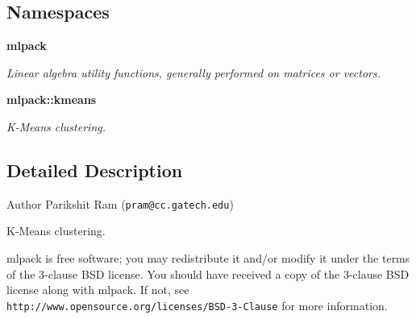 \subsection*{Namespaces}
\begin{DoxyCompactItemize}
\item 
 \textbf{ mlpack}
\begin{DoxyCompactList}\small\item\em Linear algebra utility functions, generally performed on matrices or vectors. \end{DoxyCompactList}\item 
 \textbf{ mlpack\+::kmeans}
\begin{DoxyCompactList}\small\item\em K-\/\+Means clustering. \end{DoxyCompactList}\end{DoxyCompactItemize}


\subsection{Detailed Description}
\begin{DoxyAuthor}{Author}
Parikshit Ram ({\tt pram@cc.\+gatech.\+edu})
\end{DoxyAuthor}
K-\/\+Means clustering.

mlpack is free software; you may redistribute it and/or modify it under the terms of the 3-\/clause B\+SD license. You should have received a copy of the 3-\/clause B\+SD license along with mlpack. If not, see {\tt http\+://www.\+opensource.\+org/licenses/\+B\+S\+D-\/3-\/\+Clause} for more information. 